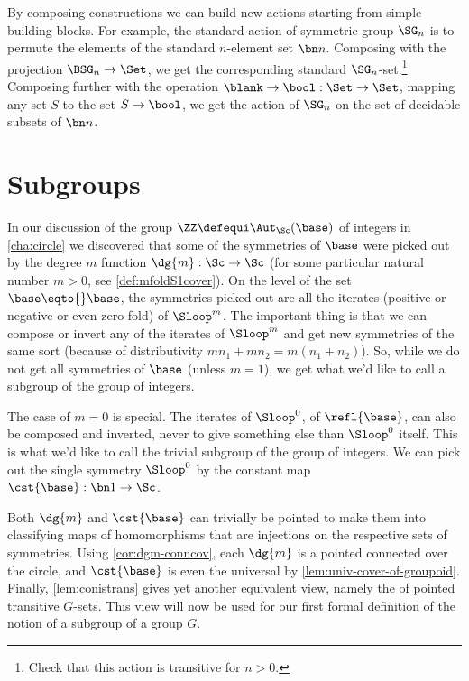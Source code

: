 \begin{example}
  By composing constructions we can build new actions
  starting from simple building blocks.
  For example, the standard action of symmetric group $\SG_n$
  is to permute the elements of the standard $n$-element set $\bn n$.
  Composing with the projection $\BSG_n \to \Set$,
  we get the corresponding standard $\SG_n$-set.\footnote{%
    Check that this action is transitive for $n>0$.}
  Composing further with the operation $\blank \to \bool : \Set \to \Set$,
  mapping any set $S$ to the set $S\to\bool$,
  we get the action of $\SG_n$ on the set of decidable subsets of $\bn n$.
\end{example}

\section{Subgroups}
\label{sec:subgroups}
In our discussion of the group $\ZZ\defequi\Aut_{\Sc}(\base)$ of integers
in \cref{cha:circle} we discovered that some of the symmetries of $\base$
were picked out by the degree $m$ function $\dg{m}: \Sc\to\Sc$
(for some particular natural number $m>0$, see \cref{def:mfoldS1cover}).  
On the level of the set $\base\eqto{}\base$, the symmetries picked out are
all the iterates (positive or negative or even zero-fold) of $\Sloop^m$.
The important thing is that we can compose or invert any of the iterates
of $\Sloop^m$ and get new symmetries of the same sort (because of
distributivity $mn_1+mn_2=m(n_1+n_2)$). So, while we do not get all
symmetries of $\base$ (unless $m=1$), we get what we'd like to call 
a subgroup of the group of integers.

The case of $m=0$ is special. The iterates of $\Sloop^0$, \ie of
$\refl{\base}$, can also be composed and inverted, never to give
something else than $\Sloop^0$ itself. This is what we'd like to call
the trivial subgroup of the group of integers. 
We can pick out the single symmetry $\Sloop^0$
by the constant map $\cst{\base} : \bn 1 \to \Sc$.

Both $\dg{m}$ and $\cst{\base}$ can trivially be pointed to make them
into classifying maps of homomorphisms that are injections on the
respective sets of symmetries. Using \cref{cor:dgm-conncov},
each $\dg{m}$ is a pointed connected \covering over the circle, and
$\cst{\base}$ is even the universal \covering by 
\cref{lem:univ-cover-of-groupoid}. Finally, \cref{lem:conistrans}
gives yet another equivalent view, namely the of pointed transitive
$G$-sets. This view will now be used for our first formal definition
of the notion of a subgroup of a group $G$.


